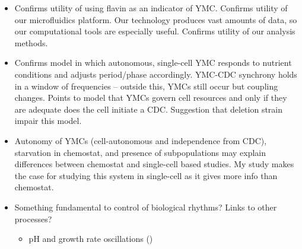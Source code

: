 \begin{itemize}
\item Confirms utility of using flavin as an indicator of YMC.  Confirms utility of our microfluidics platform.  Our technology produces vast amounts of data, so our computational tools are especially useful.  Confirms utility of our analysis methods.
\item Confirms model in which autonomous, single-cell YMC responds to nutrient conditions and adjusts period/phase accordingly.  YMC-CDC synchrony holds in a window of frequencies -- outside this, YMCs still occur but coupling changes.  Points to model that YMCs govern cell resources and only if they are adequate does the cell initiate a CDC.  Suggestion that deletion strain impair this model.
\item Autonomy of YMCs (cell-autonomous and independence from CDC), starvation in chemostat, and presence of subpopulations may explain differences between chemostat and single-cell based studies.  My study makes the case for studying this system in single-cell as it gives more info than chemostat.
\item Something fundamental to control of biological rhythms?  Links to other processes?
\begin{itemize}
\item pH and growth rate oscillations (\cite{luziaPHDependenciesGlycolytic})
\end{itemize}
\end{itemize}
